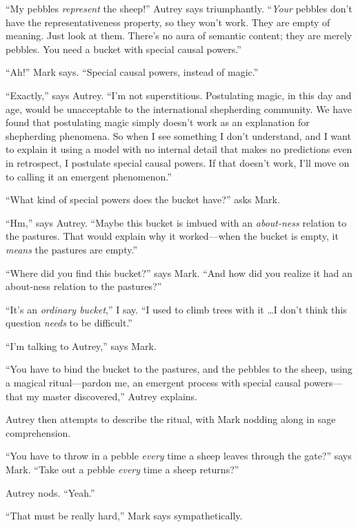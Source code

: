 {
 ``My pebbles \textit{represent} the
sheep!'' Autrey says triumphantly.
``\textit{Your} pebbles don't have the
representativeness property, so they won't work. They
are empty of meaning. Just look at them. There's no
aura of semantic content; they are merely pebbles. You need a bucket
with special causal powers.''}

{
 ``Ah!'' Mark says.
``Special causal powers, instead of
magic.''}

{
 ``Exactly,'' says Autrey.
``I'm not superstitious. Postulating
magic, in this day and age, would be unacceptable to the international
shepherding community. We have found that postulating magic simply
doesn't work as an explanation for shepherding
phenomena. So when I see something I don't understand,
and I want to explain it using a model with no internal detail that
makes no predictions even in retrospect, I postulate special causal
powers. If that doesn't work, I'll move
on to calling it an emergent phenomenon.''}

{
 ``What kind of special powers does the bucket
have?'' asks Mark.}

{
 ``Hm,'' says Autrey.
``Maybe this bucket is imbued with an
\textit{about-ness} relation to the pastures. That would explain why it
worked---when the bucket is empty, it \textit{means} the pastures are
empty.''}

{
 ``Where did you find this
bucket?'' says Mark. ``And how did
you realize it had an about-ness relation to the
pastures?''}

{
 ``It's an \textit{ordinary
bucket},'' I say. ``I used to climb
trees with it \ldots I don't think this question
\textit{needs} to be difficult.''}

{
 ``I'm talking to
Autrey,'' says Mark.}

{
 ``You have to bind the bucket to the pastures,
and the pebbles to the sheep, using a magical ritual---pardon me, an
emergent process with special causal powers---that my master
discovered,'' Autrey explains.}

{
 Autrey then attempts to describe the ritual, with Mark nodding
along in sage comprehension.}

{
 ``You have to throw in a pebble \textit{every}
time a sheep leaves through the gate?'' says Mark.
``Take out a pebble \textit{every} time a sheep
returns?''}

{
 Autrey nods. ``Yeah.''}

{
 ``That must be really hard,''
Mark says sympathetically.}

